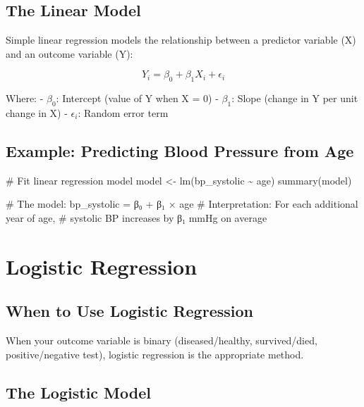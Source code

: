 \documentclass[
  11pt,
  letterpaper,
  oneside]{book}
\newenvironment{Shaded}{\begin{snugshade}}{\end{snugshade}}
\newcommand{\CommentTok}[1]{\textcolor[rgb]{0.37,0.37,0.37}{#1}}
\newcommand{\FunctionTok}[1]{\textcolor[rgb]{0.28,0.35,0.67}{#1}}
\newcommand{\NormalTok}[1]{\textcolor[rgb]{0.00,0.23,0.31}{#1}}
\newcommand{\OtherTok}[1]{\textcolor[rgb]{0.00,0.23,0.31}{#1}}
\newcommand{\SpecialCharTok}[1]{\textcolor[rgb]{0.37,0.37,0.37}{#1}}
\begin{document}
\subsection{The Linear Model}\label{the-linear-model}

Simple linear regression models the relationship between a predictor
variable (X) and an outcome variable (Y):

\[Y_i = \beta_0 + \beta_1 X_i + \epsilon_i\]

Where: - \(\beta_0\): Intercept (value of Y when X = 0) - \(\beta_1\):
Slope (change in Y per unit change in X) - \(\epsilon_i\): Random error
term

\subsection{Example: Predicting Blood Pressure from
Age}\label{example-predicting-blood-pressure-from-age}

\begin{Shaded}
\begin{Highlighting}[]
\CommentTok{\# Fit linear regression model}
\NormalTok{model }\OtherTok{\textless{}{-}} \FunctionTok{lm}\NormalTok{(bp\_systolic }\SpecialCharTok{\textasciitilde{}}\NormalTok{ age)}
\FunctionTok{summary}\NormalTok{(model)}

\CommentTok{\# The model: bp\_systolic = β₀ + β₁ × age}
\CommentTok{\# Interpretation: For each additional year of age,}
\CommentTok{\# systolic BP increases by β₁ mmHg on average}
\end{Highlighting}
\end{Shaded}

\section{Logistic Regression}\label{logistic-regression}

\subsection{When to Use Logistic
Regression}\label{when-to-use-logistic-regression}

When your outcome variable is binary (diseased/healthy, survived/died,
positive/negative test), logistic regression is the appropriate method.

\subsection{The Logistic Model}\label{the-logistic-model}
\end{document}
